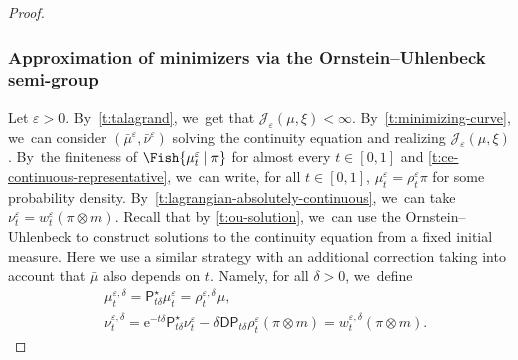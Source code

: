 \documentclass[10pt]{amsart}
\theoremstyle{definition}
\theoremstyle{remark}
\newcommand{\given}[1][]{%
\nonscript\:#1\vert
\allowbreak
\nonscript\:
\mathopen{}}
\begin{document}
\begin{proof}
\subsubsection*{Approximation of minimizers via the Ornstein--Uhlenbeck semi-group}
Let $\varepsilon > 0$.
By~\cref{t:talagrand}, we~get that $\mathcal{J}_{\varepsilon}(\mu, \xi) < \infty$.
By~\cref{t:minimizing-curve}, we~can consider $(\bar{\mu}^{\varepsilon}, \bar{\nu}^{\varepsilon})$ solving the continuity equation and realizing $\mathcal{J}_{\varepsilon}(\mu, \xi)$.
By~the finiteness of $\Fish{ \mu_{t}^{\varepsilon} \given \pi }$ for almost every $t \in [0,1]$ and \cref{t:ce-continuous-representative}, we~can write, for all $t \in [0,1]$, $\mu_{t}^{\varepsilon} = \rho_{t}^{\varepsilon} \pi$ for some probability density.
By~\cref{t:lagrangian-absolutely-continuous}, we~can take $\nu_{t}^{\varepsilon} = w_{t}^{\varepsilon} (\pi \otimes m)$.
Recall that by \cref{t:ou-solution}, we~can use the Ornstein--Uhlenbeck to construct solutions to the continuity equation from a fixed initial measure.
Here we use a similar strategy with an additional correction taking into account that $\bar{\mu}$ also depends on $t$.
Namely, for all $\delta > 0$, we~define
\begin{align*}
& \mu_{t}^{\varepsilon,\delta} = \mathsf{P}^{\star}_{t\delta} \mu_{t}^{\varepsilon} = \rho^{\varepsilon, \delta}_{t} \mu, \\
& \nu_{t}^{\varepsilon,\delta} = \mathrm{e}^{-t\delta} \mathsf{P}_{t\delta}^{\star} \nu_{t}^{\varepsilon} - \delta \mathsf{D} \mathsf{P}_{t\delta} \rho_{t}^{\varepsilon} (\pi \otimes m) = w^{\varepsilon,\delta}_{t} (\pi \otimes m).
\end{align*}


\end{proof}
\end{document}
